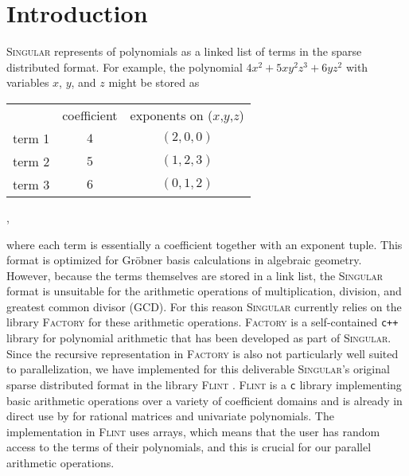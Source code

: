 \documentclass{deliverablereport}
\author{Daniel Schultz}
\begin{document}
\maketitle
\githubissuedescription


\section{Introduction}
\textsc{Singular} \cite{DGPS} represents of polynomials as a linked list of terms in the sparse distributed format. For example, the polynomial $4 x^2 + 5 x y^2 z^3 + 6 y z^2$ with variables $x$, $y$, and $z$ might be stored as
\begin{center}
\begin{tabular}{ccc}
 & coefficient & exponents on ($x$,$y$,$z$)\\
term 1 & $4$ & $(2,0,0)$\\
term 2 & $5$ & $(1,2,3)$\\
term 3 & $6$ & $(0,1,2)$
\end{tabular},
\end{center}
where each term is essentially a coefficient together with an exponent tuple. This format is optimized for Gr\"obner basis calculations in algebraic geometry. However, because the terms themselves are stored in a link list, the \textsc{Singular} format is unsuitable for the arithmetic operations of multiplication, division, and greatest common divisor (GCD). For this reason \textsc{Singular} currently relies on the library \textsc{Factory} \cite{Factory} for these arithmetic operations. \textsc{Factory} is a self-contained {\tt c++} library for polynomial arithmetic that has been developed as part of \textsc{Singular}. Since the recursive representation in \textsc{Factory} is also not particularly well suited to parallelization, we have implemented for this deliverable \textsc{Singular}'s original sparse distributed format in the library \textsc{Flint} \cite{Hart2010}. \textsc{Flint} is a {\tt c} library implementing basic arithmetic operations over a variety of coefficient domains and is already in direct use by \Sage for rational matrices and univariate polynomials. The implementation in \textsc{Flint} uses arrays, which means that the user has random access to the terms of their polynomials, and this is crucial for our parallel arithmetic operations.
\end{document}
